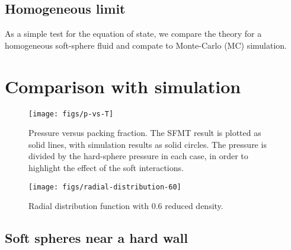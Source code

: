 \documentclass[letterpaper,twocolumn,amsmath,amssymb,prb]{revtex4-1}
\begin{document}
\subsection{Homogeneous limit}

As a simple test for the equation of state, we compare the theory for
a homogeneous soft-sphere fluid and compate to Monte-Carlo (MC) simulation.
 
\section{Comparison with simulation}

\begin{figure}
\begin{center}
\texttt{[image: figs/p-vs-T]}
\end{center}
\caption{Pressure versus packing fraction.  The SFMT result is plotted
  as solid lines, with simulation results as solid circles.  The
  pressure is divided by the hard-sphere pressure in each case, in
  order to highlight the effect of the soft interactions.}
\label{fig:p-vs-packing}
\end{figure}

\begin{figure}
\begin{center}
\texttt{[image: figs/radial-distribution-60]}
\end{center}
\caption{Radial distribution function with 0.6 reduced density.}
\label{fig:radial-distribution-60}
\end{figure}



\subsection{Soft spheres near a hard wall}
\end{document}
